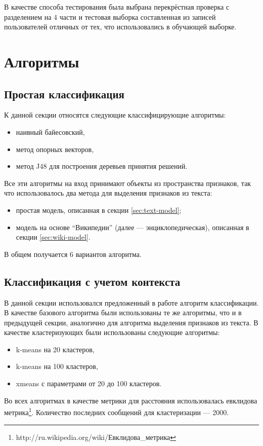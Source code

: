 В качестве способа тестирования была выбрана перекрёстная проверка с разделением на 4 части и тестовая выборка составленная из записей пользователей отличных от тех, что использовались в обучающей выборке.

\section{Алгоритмы}
\subsection{Простая классификация}
К данной секции относятся следующие классифицирующие алгоритмы: \begin{itemize}
\item наивный байесовский,
\item метод опорных векторов,
\item метод J48 для построения деревьев принятия решений.
\end{itemize}

Все эти алгоритмы на вход принимают объекты из пространства признаков, так что использовалось два метода для выделения признаков из текста: \begin{itemize}
\item простая модель, описанная в секции \ref{sec:text-model};
\item модель на основе ``Википедии'' (далее --- энциклопедическая), описанная в секции \ref{sec:wiki-model}.
\end{itemize}

В общем получается 6 вариантов алгоритма.

\subsection{Классификация с учетом контекста}
В данной секции использовался предложенный в работе алгоритм классификации. В качестве базового алгоритма были использованы те же алгоритмы, что и в предыдущей секции, аналогично для алгоритма выделения признаков из текста. В качестве кластеризующих были использованы следующие алгоритмы: \begin{itemize}
\item k-means на 20 кластеров,
\item k-means на 100 кластеров,
\item xmeans с параметрами от 20 до 100 кластеров.
\end{itemize}

Во всех алгоритмах в качестве метрики для расстояния использовалась евклидова метрика\footnote{http://ru.wikipedia.org/wiki/Евклидова\_метрика}. Количество последних сообщений для кластеризации --- 2000.

